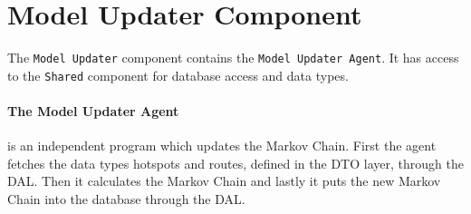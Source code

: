 \section{Model Updater Component}
The \texttt{Model Updater} component contains the \lstinline!Model Updater Agent!.
It has access to the \texttt{Shared} component for database access and data types.

\paragraph{The Model Updater Agent} is an independent program which updates the Markov Chain. First the agent fetches the data types hotspots and routes, defined in the DTO layer, through the DAL. Then it calculates the Markov Chain and lastly it puts the new Markov Chain into the database through the DAL.

